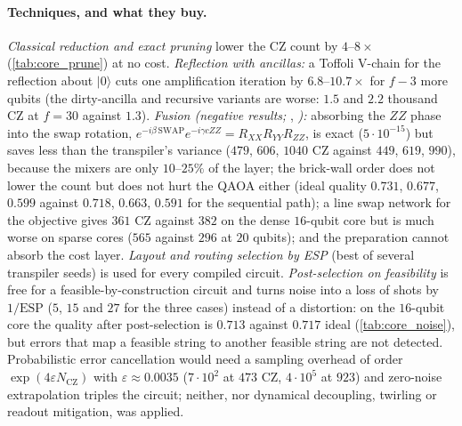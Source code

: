 \paragraph{Techniques, and what they buy.} \emph{Classical reduction and exact pruning} lower the CZ count by $4$--$8\times$ (\cref{tab:core_prune}) at no cost. \emph{Reflection with ancillas:} a Toffoli V-chain for the reflection about $|0\rangle$ cuts one amplification iteration by $6.8$--$10.7\times$ for $f-3$ more qubits (the dirty-ancilla and recursive variants are worse: $1.5$ and $2.2$ thousand CZ at $f=30$ against $1.3$). \emph{Fusion (negative results;} , \emph{):} absorbing the $ZZ$ phase into the swap rotation, $e^{-i\beta\,\mathrm{SWAP}}e^{-i\gamma cZZ}=R_{XX}R_{YY}R_{ZZ}$, is exact ($5\cdot10^{-15}$) but saves less than the transpiler's variance ($479$, $606$, $1040$ CZ against $449$, $619$, $990$), because the mixers are only $10$--$25\%$ of the layer; the brick-wall order does not lower the count but does not hurt the QAOA either (ideal quality $0.731$, $0.677$, $0.599$ against $0.718$, $0.663$, $0.591$ for the sequential path); a line swap network for the objective gives $361$ CZ against $382$ on the dense $16$-qubit core but is much worse on sparse cores ($565$ against $296$ at $20$ qubits); and the preparation cannot absorb the cost layer. \emph{Layout and routing selection by ESP} (best of several transpiler seeds) is used for every compiled circuit. \emph{Post-selection on feasibility} is free for a feasible-by-construction circuit and turns noise into a loss of shots by $1/\mathrm{ESP}$ ($5$, $15$ and $27$ for the three cases) instead of a distortion: on the $16$-qubit core the quality after post-selection is $0.713$ against $0.717$ ideal (\cref{tab:core_noise}), but errors that map a feasible string to another feasible string are not detected. Probabilistic error cancellation would need a sampling overhead of order $\exp(4\varepsilon N_\mathrm{CZ})$ with $\varepsilon\approx0.0035$ ($7\cdot10^{2}$ at $473$ CZ, $4\cdot10^{5}$ at $923$) and zero-noise extrapolation triples the circuit; neither, nor dynamical decoupling, twirling or readout mitigation, was applied.
